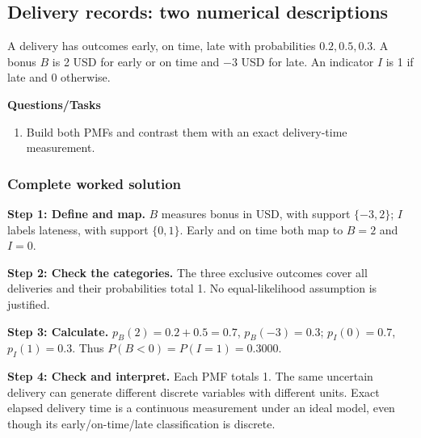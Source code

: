 \subsection{Delivery records: two numerical descriptions}
A delivery has outcomes early, on time, late with probabilities $0.2,0.5,0.3$. A bonus $B$ is 2 USD for early or on time and $-3$ USD for late. An indicator $I$ is 1 if late and 0 otherwise.

\textbf{Questions/Tasks}
\begin{enumerate}
\item Build both PMFs and contrast them with an exact delivery-time measurement.
\end{enumerate}
\subsubsection*{Complete worked solution}
\par\noindent\begin{minipage}{\linewidth}
\textbf{Step 1: Define and map.} $B$ measures bonus in USD, with support $\{-3,2\}$; $I$ labels lateness, with support $\{0,1\}$. Early and on time both map to $B=2$ and $I=0$.
\end{minipage}\par\medskip
\par\noindent\begin{minipage}{\linewidth}
\textbf{Step 2: Check the categories.} The three exclusive outcomes cover all deliveries and their probabilities total 1. No equal-likelihood assumption is justified.
\end{minipage}\par\medskip
\par\noindent\begin{minipage}{\linewidth}
\textbf{Step 3: Calculate.} $p_B(2)=0.2+0.5=0.7$, $p_B(-3)=0.3$; $p_I(0)=0.7$, $p_I(1)=0.3$. Thus $P(B<0)=P(I=1)=0.3000$.
\end{minipage}\par\medskip
\par\noindent\begin{minipage}{\linewidth}
\textbf{Step 4: Check and interpret.} Each PMF totals 1. The same uncertain delivery can generate different discrete variables with different units. Exact elapsed delivery time is a continuous measurement under an ideal model, even though its early/on-time/late classification is discrete.
\end{minipage}\par\medskip
